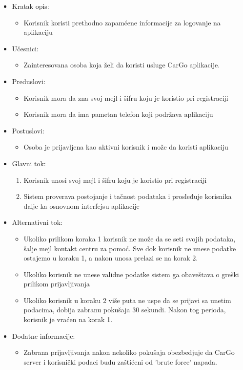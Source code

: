 \begin{itemize}
    \item Kratak opis:
        \begin{itemize}
            \item Korisnik koristi prethodno zapamćene informacije za logovanje na aplikaciju
        \end{itemize}
    \item Učesnici:
        \begin{itemize}
            \item Zainteresovana osoba koja želi da koristi usluge CarGo aplikacije.
        \end{itemize}
    \item Preduslovi:
        \begin{itemize}
            \item Korisnik mora da zna svoj mejl i šifru koju je koristio pri registraciji
            \item Korisnik mora da ima pametan telefon koji podržava aplikaciju
        \end{itemize}
    \item Postuslovi:
        \begin{itemize}
            \item Osoba je prijavljena kao aktivni korisnik i može da koristi aplikaciju
        \end{itemize}
    \item Glavni tok:
        \begin{enumerate}
            \item Korisnik unosi svoj mejl i šifru koju je koristio pri registraciji
            \item Sistem proverava postojanje i tačnost podataka i prosleđuje korisnika dalje ka osnovnom interfejsu aplikacije
        \end{enumerate}
    \item Alternativni tok:
        \begin{itemize}
            \item Ukoliko prilikom koraka 1 korisnik ne može da se seti svojih podataka, šalje mejl kontakt centru za pomoć. Sve dok korisnik ne unese podatke ostajemo u koraku 1, a nakon unosa prelazi se na korak 2.
			\item Ukoliko korisnik ne unese validne podatke sistem ga obaveštava o greški prilikom prijavljivanja
            \item Ukoliko korisnik u koraku 2 više puta ne uspe da se prijavi sa unetim podacima, dobija zabranu pokušaja 30 sekundi. Nakon tog perioda, korisnik je vraćen na korak 1.
        \end{itemize}
    \item Dodatne informacije:
        \begin{itemize}
            \item Zabrana prijavljivanja nakon nekoliko pokušaja obezbedjuje da CarGo server i korisnički podaci budu zaštićeni od 'brute force' napada.
        \end{itemize}
\end{itemize}


